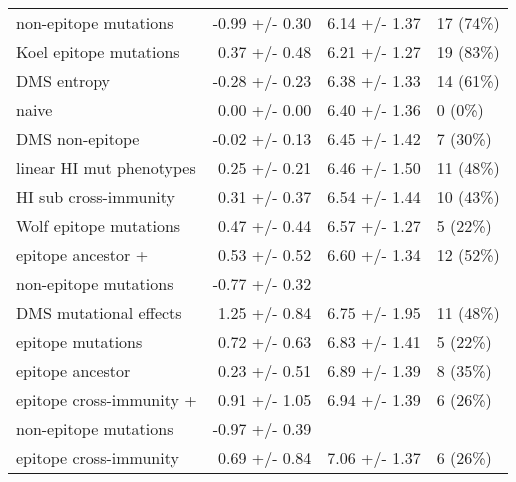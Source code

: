 \begin{tabular*}{0.85\textwidth}{lrrl}
             non-epitope mutations &  -0.99 +/- 0.30 &                          6.14 +/- 1.37 &                               17 (74\%) \\
            Koel epitope mutations &   0.37 +/- 0.48 &                          6.21 +/- 1.27 &                               19 (83\%) \\
                       DMS entropy &  -0.28 +/- 0.23 &                          6.38 +/- 1.33 &                               14 (61\%) \\
                             naive &   0.00 +/- 0.00 &                          6.40 +/- 1.36 &                                 0 (0\%) \\
                   DMS non-epitope &  -0.02 +/- 0.13 &                          6.45 +/- 1.42 &                                7 (30\%) \\
          linear HI mut phenotypes &   0.25 +/- 0.21 &                          6.46 +/- 1.50 &                               11 (48\%) \\
             HI sub cross-immunity &   0.31 +/- 0.37 &                          6.54 +/- 1.44 &                               10 (43\%) \\
            Wolf epitope mutations &   0.47 +/- 0.44 &                          6.57 +/- 1.27 &                                5 (22\%) \\
                epitope ancestor + &   0.53 +/- 0.52 &                          6.60 +/- 1.34 &                               12 (52\%) \\
 \hspace{3mm}non-epitope mutations &  -0.77 +/- 0.32 &                                        &                                         \\
            DMS mutational effects &   1.25 +/- 0.84 &                          6.75 +/- 1.95 &                               11 (48\%) \\
                 epitope mutations &   0.72 +/- 0.63 &                          6.83 +/- 1.41 &                                5 (22\%) \\
                  epitope ancestor &   0.23 +/- 0.51 &                          6.89 +/- 1.39 &                                8 (35\%) \\
          epitope cross-immunity + &   0.91 +/- 1.05 &                          6.94 +/- 1.39 &                                6 (26\%) \\
 \hspace{3mm}non-epitope mutations &  -0.97 +/- 0.39 &                                        &                                         \\
            epitope cross-immunity &   0.69 +/- 0.84 &                          7.06 +/- 1.37 &                                6 (26\%) \\
\bottomrule
\end{tabular*}
